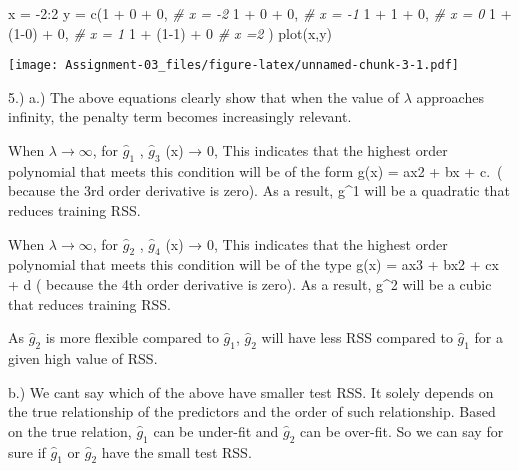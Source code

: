 \documentclass[
]{article}
\newenvironment{Shaded}{\begin{snugshade}}{\end{snugshade}}
\newcommand{\CommentTok}[1]{\textcolor[rgb]{0.56,0.35,0.01}{\textit{#1}}}
\newcommand{\DecValTok}[1]{\textcolor[rgb]{0.00,0.00,0.81}{#1}}
\newcommand{\FunctionTok}[1]{\textcolor[rgb]{0.00,0.00,0.00}{#1}}
\newcommand{\NormalTok}[1]{#1}
\newcommand{\OtherTok}[1]{\textcolor[rgb]{0.56,0.35,0.01}{#1}}
\newcommand{\SpecialCharTok}[1]{\textcolor[rgb]{0.00,0.00,0.00}{#1}}
\begin{document}
\begin{Shaded}
\begin{Highlighting}[]
\NormalTok{x }\OtherTok{=} \SpecialCharTok{{-}}\DecValTok{2}\SpecialCharTok{:}\DecValTok{2}
\NormalTok{y }\OtherTok{=} \FunctionTok{c}\NormalTok{(}\DecValTok{1} \SpecialCharTok{+} \DecValTok{0} \SpecialCharTok{+} \DecValTok{0}\NormalTok{, }\CommentTok{\# x = {-}2}
      \DecValTok{1} \SpecialCharTok{+} \DecValTok{0} \SpecialCharTok{+} \DecValTok{0}\NormalTok{, }\CommentTok{\# x = {-}1}
      \DecValTok{1} \SpecialCharTok{+} \DecValTok{1} \SpecialCharTok{+} \DecValTok{0}\NormalTok{, }\CommentTok{\# x = 0}
      \DecValTok{1} \SpecialCharTok{+}\NormalTok{ (}\DecValTok{1{-}0}\NormalTok{) }\SpecialCharTok{+} \DecValTok{0}\NormalTok{, }\CommentTok{\# x = 1}
      \DecValTok{1} \SpecialCharTok{+}\NormalTok{ (}\DecValTok{1{-}1}\NormalTok{) }\SpecialCharTok{+} \DecValTok{0} \CommentTok{\# x =2}
\NormalTok{      )}
\FunctionTok{plot}\NormalTok{(x,y)}
\end{Highlighting}
\end{Shaded}

\texttt{[image: Assignment-03\_files/figure-latex/unnamed-chunk-3-1.pdf]}

5.) a.) The above equations clearly show that when the value of
\(\lambda\) approaches infinity, the penalty term becomes increasingly
relevant.

When \(\lambda → \infty\), for \(\hat{g}_1\) , \(\hat{g}_3\) (x) → 0,
This indicates that the highest order polynomial that meets this
condition will be of the form g(x) = ax2 + bx + c.~( because the 3rd
order derivative is zero). As a result, g\^{}1 will be a quadratic that
reduces training RSS.

When \(\lambda → \infty\), for \(\hat{g}_2\) , \(\hat{g}_4\) (x) → 0,
This indicates that the highest order polynomial that meets this
condition will be of the type g(x) = ax3 + bx2 + cx + d ( because the
4th order derivative is zero). As a result, g\^{}2 will be a cubic that
reduces training RSS.

As \(\hat{g}_2\) is more flexible compared to \(\hat{g}_1\),
\(\hat{g}_2\) will have less RSS compared to \(\hat{g}_1\) for a given
high value of RSS.

b.) We cant say which of the above have smaller test RSS. It solely
depends on the true relationship of the predictors and the order of such
relationship. Based on the true relation, \(\hat{g}_1\) can be under-fit
and \(\hat{g}_2\) can be over-fit. So we can say for sure if
\(\hat{g}_1\) or \(\hat{g}_2\) have the small test RSS.
\end{document}

